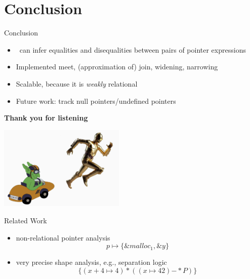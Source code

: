 \documentclass[aspectratio=169]{beamer}
\begin{document}
\section{Conclusion}

\begin{frame}{Conclusion}
    \begin{itemize}
        \item \cpo\ can infer equalities and disequalities between pairs of pointer expressions %
        \pause
        \item Implemented meet, (approximation of) join, widening, narrowing
        \pause
        \item Scalable, because it is \emph{weakly} relational
        \pause
        \item Future work: track null pointers/undefined pointers
    \end{itemize}
\end{frame}

\begin{frame}
    \centering
\huge
       \textbf{Thank you for listening}


\includegraphics[width=6cm]{images/Goblint car with C-3PO-presentation3.png}
\end{frame}

\appendix

\begin{frame}{Related Work}
    \begin{itemize}
        \item non-relational pointer analysis~\cite{Steensgaard,Andersen}
        \[
        p \mapsto \{ \&malloc_1, \&y \}
        \]
        \item very precise shape analysis, e.g., separation logic~\cite{separationlogic,rivalpapers}
        \[
             \{(x + 4 \mapsto 4)\ast ((x\mapsto 42){-\!\!*}P)\}
        \]

    \end{itemize}
\end{frame}
\end{document}
